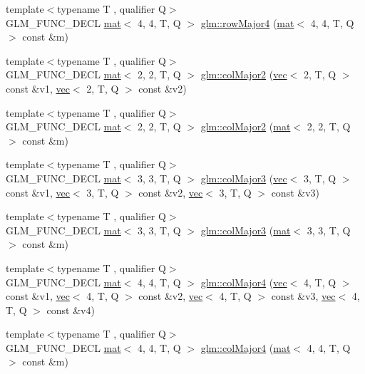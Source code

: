 \begin{DoxyCompactItemize}
\item 
{\footnotesize template$<$typename T , qualifier Q$>$ }\\G\+L\+M\+\_\+\+F\+U\+N\+C\+\_\+\+D\+E\+CL \hyperlink{structglm_1_1mat}{mat}$<$ 4, 4, T, Q $>$ \hyperlink{group__gtx__matrix__major__storage_gac92ad1c2acdf18d3eb7be45a32f9566b}{glm\+::row\+Major4} (\hyperlink{structglm_1_1mat}{mat}$<$ 4, 4, T, Q $>$ const \&m)
\item 
{\footnotesize template$<$typename T , qualifier Q$>$ }\\G\+L\+M\+\_\+\+F\+U\+N\+C\+\_\+\+D\+E\+CL \hyperlink{structglm_1_1mat}{mat}$<$ 2, 2, T, Q $>$ \hyperlink{group__gtx__matrix__major__storage_gaaff72f11286e59a4a88ed21a347f284c}{glm\+::col\+Major2} (\hyperlink{structglm_1_1vec}{vec}$<$ 2, T, Q $>$ const \&v1, \hyperlink{structglm_1_1vec}{vec}$<$ 2, T, Q $>$ const \&v2)
\item 
{\footnotesize template$<$typename T , qualifier Q$>$ }\\G\+L\+M\+\_\+\+F\+U\+N\+C\+\_\+\+D\+E\+CL \hyperlink{structglm_1_1mat}{mat}$<$ 2, 2, T, Q $>$ \hyperlink{group__gtx__matrix__major__storage_gafc25fd44196c92b1397b127aec1281ab}{glm\+::col\+Major2} (\hyperlink{structglm_1_1mat}{mat}$<$ 2, 2, T, Q $>$ const \&m)
\item 
{\footnotesize template$<$typename T , qualifier Q$>$ }\\G\+L\+M\+\_\+\+F\+U\+N\+C\+\_\+\+D\+E\+CL \hyperlink{structglm_1_1mat}{mat}$<$ 3, 3, T, Q $>$ \hyperlink{group__gtx__matrix__major__storage_ga1e25b72b085087740c92f5c70f3b051f}{glm\+::col\+Major3} (\hyperlink{structglm_1_1vec}{vec}$<$ 3, T, Q $>$ const \&v1, \hyperlink{structglm_1_1vec}{vec}$<$ 3, T, Q $>$ const \&v2, \hyperlink{structglm_1_1vec}{vec}$<$ 3, T, Q $>$ const \&v3)
\item 
{\footnotesize template$<$typename T , qualifier Q$>$ }\\G\+L\+M\+\_\+\+F\+U\+N\+C\+\_\+\+D\+E\+CL \hyperlink{structglm_1_1mat}{mat}$<$ 3, 3, T, Q $>$ \hyperlink{group__gtx__matrix__major__storage_ga86bd0656e787bb7f217607572590af27}{glm\+::col\+Major3} (\hyperlink{structglm_1_1mat}{mat}$<$ 3, 3, T, Q $>$ const \&m)
\item 
{\footnotesize template$<$typename T , qualifier Q$>$ }\\G\+L\+M\+\_\+\+F\+U\+N\+C\+\_\+\+D\+E\+CL \hyperlink{structglm_1_1mat}{mat}$<$ 4, 4, T, Q $>$ \hyperlink{group__gtx__matrix__major__storage_gaf4aa6c7e17bfce41a6c13bf6469fab05}{glm\+::col\+Major4} (\hyperlink{structglm_1_1vec}{vec}$<$ 4, T, Q $>$ const \&v1, \hyperlink{structglm_1_1vec}{vec}$<$ 4, T, Q $>$ const \&v2, \hyperlink{structglm_1_1vec}{vec}$<$ 4, T, Q $>$ const \&v3, \hyperlink{structglm_1_1vec}{vec}$<$ 4, T, Q $>$ const \&v4)
\item 
{\footnotesize template$<$typename T , qualifier Q$>$ }\\G\+L\+M\+\_\+\+F\+U\+N\+C\+\_\+\+D\+E\+CL \hyperlink{structglm_1_1mat}{mat}$<$ 4, 4, T, Q $>$ \hyperlink{group__gtx__matrix__major__storage_gaf3f9511c366c20ba2e4a64c9e4cec2b3}{glm\+::col\+Major4} (\hyperlink{structglm_1_1mat}{mat}$<$ 4, 4, T, Q $>$ const \&m)
\end{DoxyCompactItemize}


